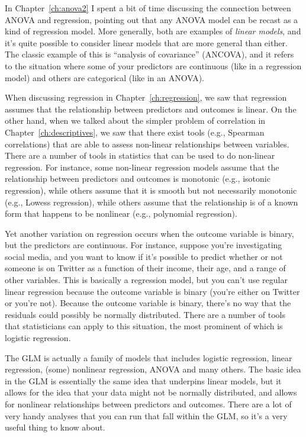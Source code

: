 \begin{itemize}
 In Chapter~\ref{ch:anova2} I spent a bit of time discussing the connection between ANOVA and regression, pointing out that any ANOVA model can be recast as a kind of regression model. More generally, both are examples of {\it linear models}, and it's quite possible to consider linear models that are more general than either. The classic example of this is ``analysis of covariance'' (ANCOVA), and it refers to the situation where some of your predictors are continuous (like in a regression model) and others are categorical (like in an ANOVA).

 When discussing regression in Chapter~\ref{ch:regression}, we saw that regression assumes that the relationship between predictors and outcomes is linear. On the other hand, when we talked about the simpler problem of correlation in Chapter~\ref{ch:descriptives}, we saw that there exist tools (e.g., Spearman correlations) that are able to assess non-linear relationships between variables. There are a number of tools in statistics that can be used to do non-linear regression. For instance,  some non-linear regression models assume that the relationship between predictors and outcomes is monotonic (e.g., isotonic regression), while others assume that it is smooth but not necessarily monotonic (e.g., Lowess regression), while others assume that the relationship is of a known form that happens to be nonlinear (e.g., polynomial regression). 

 Yet another variation on regression occurs when the outcome variable is binary, but the predictors are continuous. For instance, suppose you're investigating social media, and you want to know if it's possible to predict whether or not someone is on Twitter as a function of their income, their age, and a range of other variables. This is basically a regression model, but you can't use regular linear regression because the outcome variable is binary (you're either on Twitter or you're not). Because the outcome variable is binary, there's no way that the residuals could possibly be normally distributed. There are a number of tools that statisticians can apply to this situation, the most prominent of which is logistic regression.  

 The GLM is actually a family of models that includes logistic regression, linear regression, (some) nonlinear regression, ANOVA and many others. The basic idea in the GLM is essentially the same idea that underpins linear models, but it allows for the idea that your data might not be normally distributed, and allows for nonlinear relationships between predictors and outcomes. There are a lot of very handy analyses that you can run that fall within the GLM, so it's a very useful thing to know about.  


\end{itemize}
